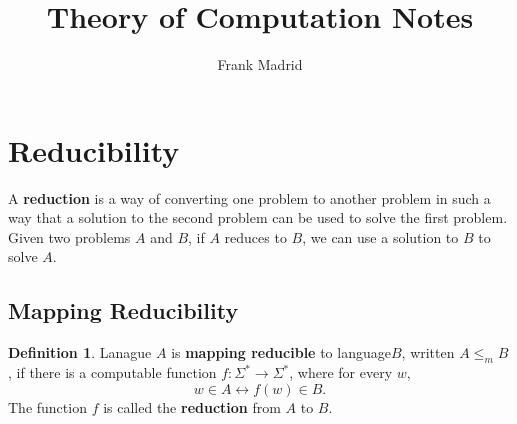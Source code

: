 \documentclass{article}
\theoremstyle{definition}
\newtheorem{definition}{Definition}
\begin{document}
\title{Theory of Computation Notes}
\author{Frank Madrid}
\maketitle
\tableofcontents

\section{Reducibility}
A \textbf{reduction} is a way of converting one problem to another problem in such a way that a solution to the second problem can be used to solve the first problem. Given two problems $A$ and $B$, if $A$ reduces to $B$, we can use a solution to $B$ to solve $A$.

\subsection{Mapping Reducibility}
\begin{definition}
	Lanague $A$ is \textbf{mapping reducible} to language$B$, written $A\le_m B$, if there is a computable function $f:\Sigma^* \rightarrow \Sigma^*$, where for every $w$,\begin{equation*}
	w\in A \leftrightarrow f(w) \in B.
	\end{equation*}
	The function $f$ is called the \textbf{reduction} from $A$ to $B$.
\end{definition}
\end{document}
